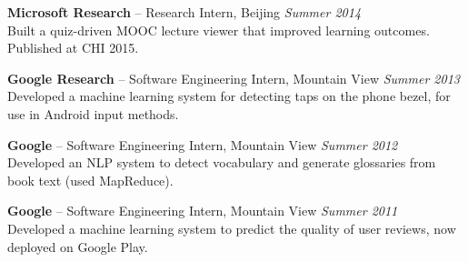 \documentclass[margin,line]{resume}
\begin{document}
\begin{resume}
\vspace{-6mm}

\textbf{Microsoft Research} -- Research Intern, Beijing \hfill \textsl{Summer 2014}\\
Built a quiz-driven MOOC lecture viewer that improved learning outcomes. Published at CHI 2015.\\ %

\vspace{-6mm}

\textbf{Google Research} -- Software Engineering Intern, Mountain View \hfill \textsl{Summer 2013}\\
Developed a machine learning system for detecting taps on the phone bezel, for use in Android input methods.\\

\vspace{-6mm}

\textbf{Google} -- Software Engineering Intern, Mountain View \hfill \textsl{Summer 2012}\\
Developed an NLP system to detect vocabulary and generate glossaries from book text (used MapReduce).\\ %

\vspace{-6mm}

\textbf{Google} -- Software Engineering Intern, Mountain View \hfill \textsl{Summer 2011}\\
Developed a machine learning system to predict the quality of user reviews, now deployed on Google Play.\\


\end{resume}
\end{document}
